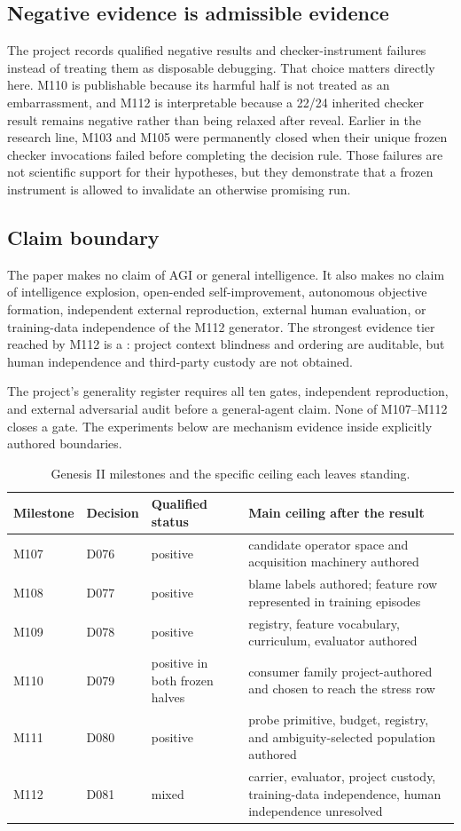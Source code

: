 \subsection{Negative evidence is admissible evidence}
The project records qualified negative results and checker-instrument failures instead of treating them as disposable debugging. That choice matters directly here. M110 is publishable because its harmful half is not treated as an embarrassment, and M112 is interpretable because a 22/24 inherited checker result remains negative rather than being relaxed after reveal. Earlier in the research line, M103 and M105 were permanently closed when their unique frozen checker invocations failed before completing the decision rule. Those failures are not scientific support for their hypotheses, but they demonstrate that a frozen instrument is allowed to invalidate an otherwise promising run.

\subsection{Claim boundary}
The paper makes no claim of AGI or general intelligence. It also makes no claim of intelligence explosion, open-ended self-improvement, autonomous objective formation, independent external reproduction, external human evaluation, or training-data independence of the M112 generator. The strongest evidence tier reached by M112 is a : project context blindness and ordering are auditable, but human independence and third-party custody are not obtained.

The project's generality register requires all ten gates, independent reproduction, and external adversarial audit before a general-agent claim. None of M107--M112 closes a gate. The experiments below are mechanism evidence inside explicitly authored boundaries.

\begin{table}[H]
\centering
\small
\caption{Genesis II milestones and the specific ceiling each leaves standing.}
\label{tab:milestones}
\begin{tabularx}{\textwidth}{@{}l l l X@{}}
\toprule
Milestone & Decision & Qualified status & Main ceiling after the result \\
\midrule
M107 & D076 & positive & candidate operator space and acquisition machinery authored \\
M108 & D077 & positive & blame labels authored; feature row represented in training episodes \\
M109 & D078 & positive & registry, feature vocabulary, curriculum, evaluator authored \\
M110 & D079 & positive in both frozen halves & consumer family project-authored and chosen to reach the stress row \\
M111 & D080 & positive & probe primitive, budget, registry, and ambiguity-selected population authored \\
M112 & D081 & mixed & carrier, evaluator, project custody, training-data independence, human independence unresolved \\
\bottomrule
\end{tabularx}
\end{table}

